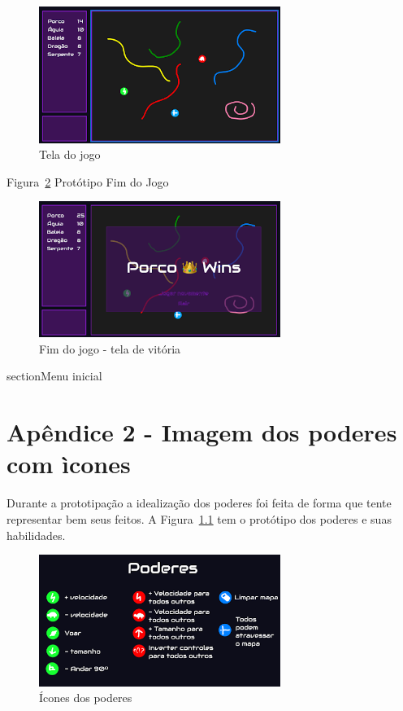 \begin{apendicesenv}
\begin{figure}[htbp]
    \centering
    \caption{Tela do jogo}
    \label{fig:prototipo-in-game}
    \includegraphics[width=0.7\textwidth]{figuras/prototipo-in-game.png}
\end{figure}

Figura~\ref{fig:prototipo-end-game} Protótipo Fim do Jogo

\begin{figure}[htbp]
    \centering
    \caption{Fim do jogo - tela de vitória}
    \label{fig:prototipo-end-game}
    \includegraphics[width=0.7\textwidth]{figuras/prototipo-end-game.png}
\end{figure}

section{Menu inicial}

\chapter{Apêndice 2 - Imagem dos poderes com ìcones}

Durante a prototipação a idealização dos poderes foi feita de forma que tente representar bem seus feitos. A Figura~\ref{fig:prototipo-poderes} tem o protótipo dos poderes e suas habilidades.

\begin{figure}[htbp]
    \centering
    \caption{Ícones dos poderes}
    \label{fig:prototipo-poderes}
    \includegraphics[width=0.7\textwidth]{figuras/prototipo-poderes.png}
\end{figure}


\end{apendicesenv}
